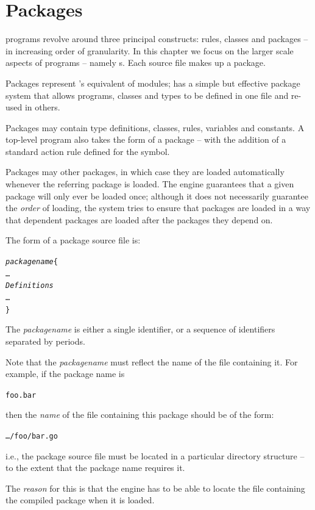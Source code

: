 \chapter{Packages}
\label{package}

\go programs revolve around three principal constructs: rules, classes and packages -- in increasing order of granularity. In this chapter we focus on the larger scale aspects of \go programs -- namely s. Each \go source file makes up a package.

Packages represent \go's equivalent of modules; \go has a simple but effective package system that allows programs, classes and types to be defined in one file and re-used in others.


Packages may contain type definitions, classes, rules, variables and constants. A top-level program also takes the form of a package -- with the addition of a standard action rule defined for the  symbol.

Packages may  other packages, in which case they are loaded automatically whenever the referring package is loaded. The \go engine guarantees that a given package will only ever be loaded once; although it does not necessarily guarantee the \emph{order} of loading, the system tries to ensure that packages are loaded in a way that dependent packages are loaded after the packages they depend on.

The form of a package source file is:
\begin{alltt}
\emph{packagename}\{
  \ldots
  \emph{Definitions}
  \ldots
\}
\end{alltt}
The \emph{packagename} is either a single identifier, or a sequence of identifiers separated by periods.

Note that the \emph{packagename} must reflect the name of the file containing it. For example, if the package name is 
\begin{alltt}
foo.bar
\end{alltt}
then the \emph{name} of the file containing this package should be of the form:
\begin{alltt}
\ldots/foo/bar.go
\end{alltt}
i.e., the package source file must be located in a particular directory structure -- to the extent that the package name requires it.
\begin{aside}
The \emph{reason} for this is that the \go engine has to be able to locate the file containing the compiled package when it is loaded.
\end{aside}

